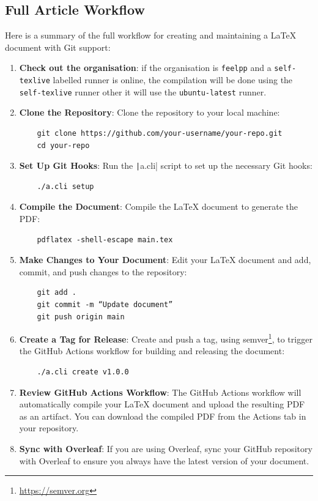 \documentclass[a4paper]{article}
\begin{document}
\subsection{Full Article Workflow}
\label{sec:full-article-workflow}


Here is a summary of the full workflow for creating and maintaining a \LaTeX{} document with Git support:

\begin{enumerate}
    \item \textbf{Check out the organisation}: if the organisation is \texttt{feelpp} and a \texttt{self-texlive} labelled runner is online, the compilation will be done using the \texttt{self-texlive} runner other it will use the \texttt{ubuntu-latest} runner.
    \item \textbf{Clone the Repository}:
    Clone the repository to your local machine:
    \begin{verbatim}
    git clone https://github.com/your-username/your-repo.git
    cd your-repo
    \end{verbatim}
    \item \textbf{Set Up Git Hooks}:
    Run the \texttt|a.cli| script to set up the necessary Git hooks:
    \begin{verbatim}
    ./a.cli setup
    \end{verbatim}
    \item  \textbf{Compile the Document}:
    Compile the \LaTeX{} document to generate the PDF:
    \begin{verbatim}
    pdflatex -shell-escape main.tex
    \end{verbatim}
    \item \textbf{Make Changes to Your Document}:
    Edit your \LaTeX{} document and add, commit, and push changes to the repository:
    \begin{verbatim}
    git add .
    git commit -m “Update document”
    git push origin main
    \end{verbatim}
    \item \textbf{Create a Tag for Release}:
    Create and push a tag, using semver\footnote{\url{https://semver.org}},  to trigger the GitHub Actions workflow for building and releasing the document:
    \begin{verbatim}
    ./a.cli create v1.0.0
    \end{verbatim}
    \item \textbf{Review GitHub Actions Workflow}:
    The GitHub Actions workflow will automatically compile your \LaTeX{} document and upload the resulting PDF as an artifact.
    You can download the compiled PDF from the Actions tab in your repository.
    \item \textbf{Sync with Overleaf}:
    If you are using Overleaf, sync your GitHub repository with Overleaf to ensure you always have the latest version of your document.
\end{enumerate}
\end{document}
